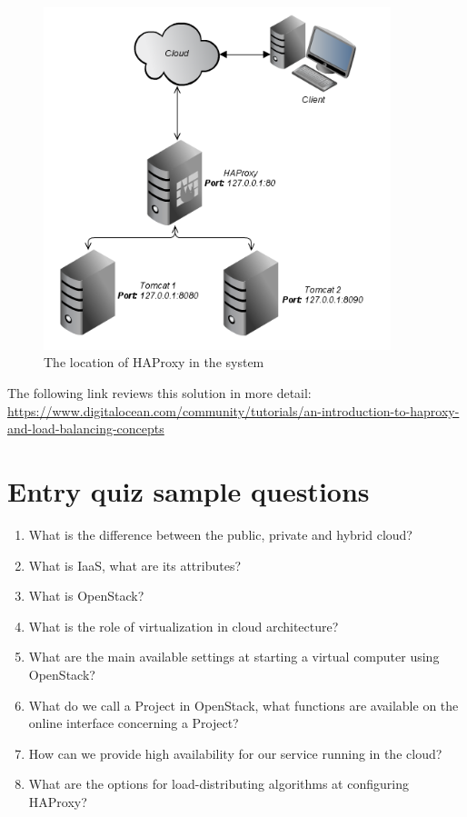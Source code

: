 \documentclass[a4paper]{article}
\begin{document}
\begin{figure}[H]
    \centering
    \includegraphics[width=0.9\textwidth]{figures/haproxy.png}
    \caption{The location of HAProxy in the system}
    \label{fig:haproxy}
\end{figure}

The following link reviews this solution in more detail:
\url{https://www.digitalocean.com/community/tutorials/an-introduction-to-haproxy-and-load-balancing-concepts}


\appendix

\section{Entry quiz sample questions}

\begin{enumerate}
\item What is the difference between the public, private and hybrid cloud?
\item What is IaaS, what are its attributes?
\item What is OpenStack?
\item What is the role of virtualization in cloud architecture?
\item What are the main available settings at starting a virtual computer using OpenStack?
\item What do we call a Project in OpenStack, what functions are available on the online interface concerning a Project?
\item How can we provide high availability for our service running in the cloud?
\item What are the options for load-distributing algorithms at configuring HAProxy?
\end{enumerate}
\end{document}
